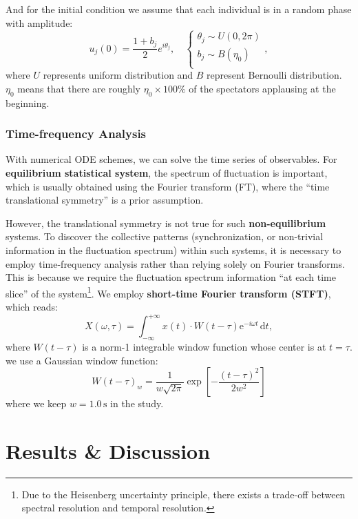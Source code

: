 \documentclass[UTF8,a4paper,11pt]{ctexart}
\begin{document}
And for the initial condition we assume that each individual is in a random phase with amplitude:
$$
    u_j(0) = \frac{1+b_j}{2} e^{iθ_j}, \quad \begin{cases}
        θ_j \sim U(0,2π) \\
        b_j \sim B(η_0) \\
    \end{cases} ,
$$
where $U$ represents uniform distribution and $B$ represent Bernoulli distribution. $η_0$ means that there are roughly $η_0× 100\%$ of the spectators applausing at the beginning.

\subsubsection{Time-frequency Analysis}

With numerical ODE schemes, we can solve the time series of observables. For \textbf{equilibrium statistical system}, the spectrum of fluctuation is important, which is usually obtained using the Fourier transform (FT), where the ``time translational symmetry'' is a prior assumption.

However, the translational symmetry is not true for such \textbf{non-equilibrium} systems. To discover the collective patterns (synchronization, or non-trivial information in the fluctuation spectrum) within such systems, it is necessary to employ time-frequency analysis rather than relying solely on Fourier transforms. This is because we require the fluctuation spectrum information ``at each time slice'' of the system\footnote{Due to the Heisenberg uncertainty principle, there exists a trade-off between spectral resolution and temporal resolution.}. We employ \textbf{short-time Fourier transform (STFT)}, which reads:
\begin{equation}
    X(ω,τ) = \int_{-∞}^{+∞} x(t)⋅W(t-τ) \mathrm{e}^{-iωt}\, \mathrm{d}t,
\end{equation}
where $W(t-τ)$ is a norm-1 integrable window function whose center is at $t=τ$. we use a Gaussian window function:
\begin{equation}
    W(t-τ)_w = \frac{1}{w\sqrt{2π}} \exp\left[ -\frac{(t-τ)^2}{2w^2} \right]
\end{equation}
where we keep $w = 1.0 \,\mathrm{s}$ in the study.

\section{Results \& Discussion}
\end{document}
